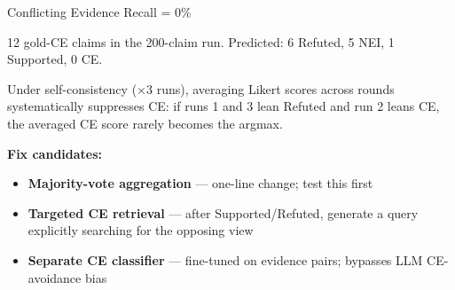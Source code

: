 \documentclass[11pt, aspectratio=169]{beamer}
\begin{document}
\begin{frame}{Conflicting Evidence Recall = 0\%}

  12 gold-CE claims in the 200-claim run.
  Predicted: 6 Refuted, 5 NEI, 1 Supported, \alert{0 CE.}

  \medskip
  Under self-consistency ($\times 3$ runs), averaging Likert scores across rounds
  systematically suppresses CE: if runs 1 and 3 lean Refuted and run 2 leans CE,
  the averaged CE score rarely becomes the argmax.

  \bigskip
  \textbf{Fix candidates:}
  \begin{itemize}\setlength{\itemsep}{10pt}
    \item \textbf{Majority-vote aggregation} — one-line change; test this first
    \item \textbf{Targeted CE retrieval} — after Supported/Refuted, generate a query
          explicitly searching for the opposing view
    \item \textbf{Separate CE classifier} — fine-tuned on evidence pairs;
          bypasses LLM CE-avoidance bias
  \end{itemize}
\end{frame}
\end{document}
